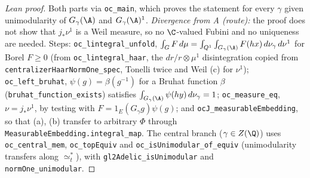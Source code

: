 \begin{proof}[Lean proof]
Both parts via \texttt{oc\_main}, which proves the statement for every $\gamma$ given unimodularity of $G_\gamma(\A)$ and $G_\gamma(\A)^1$. \emph{Divergence from A (route):} the proof does not show that $j_*\nu^1$ is a Weil measure, so no $\C$-valued Fubini and no uniqueness are needed. Steps: \texttt{oc\_lintegral\_unfold}, $\int_G F\,d\mu=\int_{Q^1}\int_{G_\gamma(\A)}F(hx)\,d\nu_\gamma\,d\nu^1$ for Borel $F\ge0$ (from \texttt{oc\_lintegral\_haar}, the $dr/r\otimes\mu^1$ disintegration copied from \texttt{centralizerHaarNormOne\_spec}, Tonelli twice and Weil (c) for $\nu^1$); \texttt{oc\_left\_bruhat}, $\psi(g)=\beta(g^{-1})$ for a Bruhat function $\beta$ (\texttt{bruhat\_function\_exists}) satisfies $\int_{G_\gamma(\A)}\psi(hy)\,d\nu_\gamma=1$; \texttt{oc\_measure\_eq}, $\nu=j_*\nu^1$, by testing with $F=1_E(G_\gamma g)\psi(g)$; and \texttt{ocJ\_measurableEmbedding}, so that (a), (b) transfer to arbitrary $\Phi$ through \texttt{MeasurableEmbedding.integral\_map}. The central branch ($\gamma\in Z(\Q)$) uses \texttt{oc\_central\_mem}, \texttt{oc\_topEquiv} and \texttt{oc\_isUnimodular\_of\_equiv} (unimodularity transfers along $\simeq_t^*$), with \texttt{gl2Adelic\_isUnimodular} and \texttt{normOne\_unimodular}.
\end{proof}


